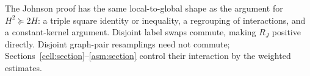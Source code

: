 \begin{remark}
The Johnson proof has the same local-to-global shape as the argument for
$H^2\succeq2H$: a triple square identity or inequality, a regrouping of
interactions, and a constant-kernel argument. Disjoint label swaps commute,
making $R_J$ positive directly. Disjoint graph-pair resamplings need not
commute; Sections~\ref{cell:section}--\ref{asm:section} control their
interaction by the weighted estimates.
\end{remark}
